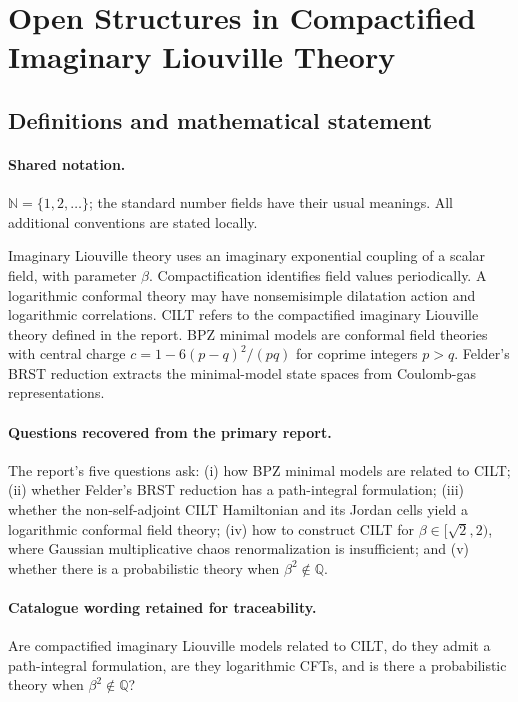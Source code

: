 \documentclass[11pt]{article}
\begin{document}
\section{Open Structures in Compactified Imaginary Liouville Theory}\label{statement}

\subsection{Definitions and mathematical statement}

\paragraph{Shared notation.}$\mathbb N=\{1,2,\ldots\}$; the standard number fields have their usual meanings. All additional conventions are stated locally.


Imaginary Liouville theory uses an imaginary exponential coupling of a scalar field, with parameter $\beta$. Compactification identifies field values periodically. A logarithmic conformal theory may have nonsemisimple dilatation action and logarithmic correlations. CILT refers to the compactified imaginary Liouville theory defined in the report. BPZ minimal models are conformal field theories with central charge $c=1-6(p-q)^2/(pq)$ for coprime integers $p>q$. Felder's BRST reduction extracts the minimal-model state spaces from Coulomb-gas representations.

\paragraph{Questions recovered from the primary report.}The report's five questions ask: (i) how BPZ minimal models are related to CILT; (ii) whether Felder's BRST reduction has a path-integral formulation; (iii) whether the non-self-adjoint CILT Hamiltonian and its Jordan cells yield a logarithmic conformal field theory; (iv) how to construct CILT for $\beta\in[\sqrt2,2)$, where Gaussian multiplicative chaos renormalization is insufficient; and (v) whether there is a probabilistic theory when $\beta^2\notin\mathbb Q$.

\paragraph{Catalogue wording retained for traceability.}
Are compactified imaginary Liouville models related to CILT, do they admit a path-integral formulation, are they logarithmic CFTs, and is there a probabilistic theory when $\beta^2\notin\mathbb{Q}$?
\end{document}
